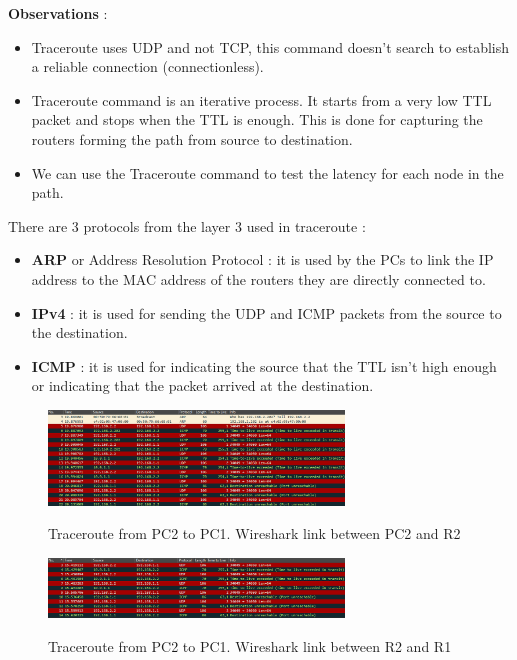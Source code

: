 \documentclass[10pt,a4paper]{ULBreport}
\begin{document}
\textbf{Observations} : 
\begin{itemize}
    \item Traceroute uses UDP and not TCP, this command doesn't search to establish a reliable connection (connectionless).
    \item Traceroute command is an iterative process. It starts from a very low TTL packet and stops when the TTL is enough. This is done for capturing the routers forming the path from source to destination.
    \item We can use the Traceroute command to test the latency for each node in the path.
\end{itemize}


There are 3 protocols from the layer 3 used in traceroute :

\begin{itemize}
    \item \textbf{ARP} or Address Resolution Protocol : it is used by the PCs to link the IP address to the MAC address of the routers they are directly connected to.
    \item \textbf{IPv4} : it is used for sending the UDP and ICMP packets from the source to the destination.
    \item \textbf{ICMP} : it is used for indicating the source that the TTL isn't high enough or indicating that the packet arrived at the destination.  
\end{itemize}

\begin{figure}[H]
    \caption{Traceroute from PC2 to PC1. Wireshark link between PC2 and R2}
    \center
    \includegraphics[width=0.7\textwidth]{traceroutePC2R2.png}
    \label{traceroutepc2r2}
\end{figure}

\begin{figure}[H]
    \caption{Traceroute from PC2 to PC1. Wireshark link between R2 and R1}
    \center
    \includegraphics[width=0.7\textwidth]{tracerouteR2R1.png}
    \label{tracerouter2r1}
\end{figure}
\end{document}
